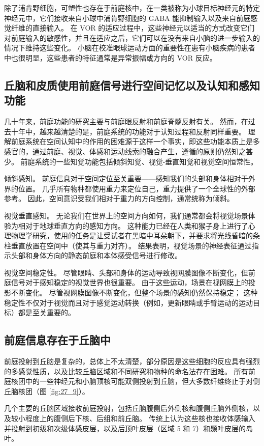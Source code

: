 除了浦肯野细胞，可塑性也存在于前庭核中，在一类被称为小球目标神经元的特定神经元中，它们接收来自小球中浦肯野细胞的 GABA 能抑制输入以及来自前庭感觉纤维的直接输入。 在 VOR 的适应过程中，这些神经元以适当的方式改变它们对前庭输入的敏感性，并且在适应之后，它们可以在没有来自小脑的进一步输入的情况下维持这些变化。 小脑在校准眼球运动方面的重要性在患有小脑疾病的患者中也很明显，这些患者的特征通常是异常振幅或方向的 VOR 反应。

\subsection{丘脑和皮质使用前庭信号进行空间记忆以及认知和感知功能}
几十年来，前庭功能的研究主要与前庭眼反射和前庭脊髓反射有关。 然而，在过去十年中，越来越清楚的是，前庭系统的功能对于认知过程和反射同样重要。 理解前庭系统在空间认知中的作用的困难源于这样一个事实，即这些功能本质上是多感官的，通过前庭、视觉、体感和运动线索的融合产生，遵循的原则仍然知之甚少。 前庭系统的一些知觉功能包括倾斜知觉、视觉-垂直知觉和视觉空间恒常性。

倾斜感知。 前庭信息对于空间定位至关重要——感知我们的头部和身体相对于外界的位置。 几乎所有物种都使用重力来定位自己，重力提供了一个全球性的外部参考。 因此，空间意识受我们相对于重力的方向控制，通常统称为倾斜。

视觉垂直感知。 无论我们在世界上的空间方向如何，我们通常都会将视觉场景体验为相对于地球垂直方向的感知方向。 这种能力已经在人类和猴子身上进行了心理物理学研究，使用的任务是让受试者在黑暗中耳朵朝下，并要求将光线昏暗的条柱垂直放置在空间中（使其与重力对齐）。 结果表明，视觉场景的神经表征通过指示头部和身体方向的静态前庭和本体感受信号进行修改。

视觉空间稳定性。 尽管眼睛、头部和身体的运动导致视网膜图像不断变化，但前庭信号对于感知稳定的视觉世界也很重要。 由于这些运动，场景在视网膜上的投影不断变化。 尽管视网膜图像不断变化，但整个场景的感知仍然保持稳定； 这种稳定性不仅对于视觉而且对于感觉运动转换（例如，更新眼睛或手臂运动的运动目标）都是至关重要的。

\subsection{前庭信息存在于丘脑中}
前庭投射到丘脑是复杂的，总体上不太清楚，部分原因是这些细胞的反应具有强烈的多感觉性质，以及比较丘脑区域和不同研究和物种的命名法存在困难。 所有前庭核团中的一些神经元和小脑顶核可能双侧投射到丘脑，但大多数纤维终止于对侧丘脑核团（图 \ref{fig:27_9}）。

几个主要的丘脑区域接收前庭投射，包括丘脑腹侧后外侧核和腹侧丘脑外侧核，以及较小程度上的腹侧后下核、后组和前丘脑。 传统上认为这些核也接收体感输入并投射到初级和次级体感皮层，以及后顶叶皮层（区域 5 和 7）和颞叶皮层的岛叶。


